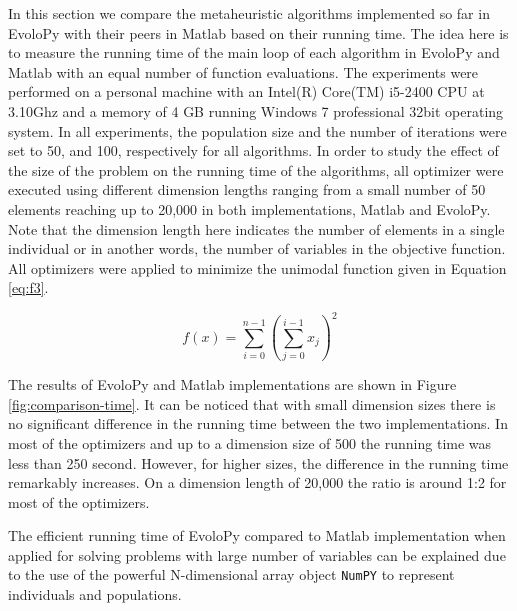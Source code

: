 \documentclass[a4paper,twoside]{article}
\begin{document}
In this section we compare the metaheuristic algorithms implemented so far in EvoloPy with their peers in Matlab based on their running time. The idea here is to measure the running time of the main loop of each algorithm in EvoloPy and Matlab with an equal number of function evaluations. The experiments were performed on a personal machine with an Intel(R) Core(TM) i5-2400 CPU at 3.10Ghz and a memory of 4 GB running Windows 7 professional 32bit operating system. In all experiments, the population size and the number of iterations were set to 50, and 100, respectively for all algorithms. In order to study the effect of the size of the problem on the running time of the algorithms, all optimizer were executed using different dimension lengths ranging from a small number of 50 elements reaching up to 20,000 in both implementations, Matlab and EvoloPy. Note that the dimension length here indicates the number of elements in a single individual or in another words, the number of variables in the objective function. All optimizers were applied to minimize the unimodal function given in Equation \ref{eq:f3}. 



\begin{equation}
f(x)=\sum_{i=0}^{n-1}(\sum_{j=0}^{i-1}x_{j})^{2}
\label{eq:f3}
\end{equation}

The results of EvoloPy and Matlab implementations are shown in Figure
\ref{fig:comparison-time}. It can be noticed that with small dimension
sizes there is no significant difference in the running time between
the two implementations. In most of the optimizers and up to a
dimension size of 500  the running time was less than 250
second. However, for higher sizes, the difference in the running time
remarkably increases. On a dimension length of 20,000 the ratio is
around 1:2 for most of the optimizers. 

The efficient running time of EvoloPy compared to Matlab
implementation when applied for solving problems with large number of
variables can be explained due to the use of the powerful
N-dimensional array object \texttt{NumPY} to represent individuals and
populations. 
\end{document}
